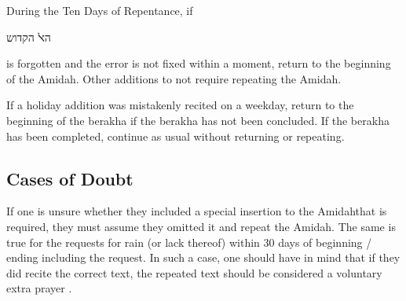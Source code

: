 \documentclass[11pt]{article}
\newcommand{\hebword}[1]{‎\begin{hebrew}\beginR #1 \endR\end{hebrew}}
\newcommand{\amidah}{Amidah\space}
\newcommand{\amidahnospace}{Amidah}
\begin{document}
During the Ten Days of Repentance, if \hebword{הﭏ הקדוש} is forgotten and the error is not fixed within a moment, return to the beginning of the \amidahnospace.  Other additions to not require repeating the \amidahnospace.

If a holiday addition was mistakenly recited on a weekday, return to the beginning of the berakha if the berakha has not been concluded.  If the berakha has been completed, continue as usual without returning or repeating.

\subsection{Cases of Doubt}

If one is unsure whether they included a special insertion to the \amidah that is required, they must assume they omitted it and repeat the \amidahnospace.  The same is true for the requests for rain (or lack thereof) within 30 days of beginning / ending including the request.  In such a case, one should have in mind that if they did recite the correct text, the repeated text should be considered a voluntary extra prayer \parencite*[18:6]{PH}.
\end{document}
